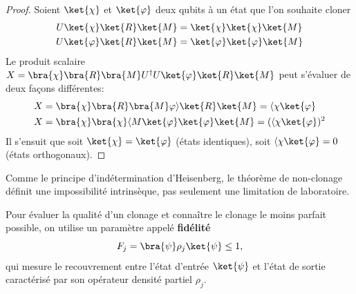 \begin{proof}
Soient $\ket{\chi}$ et $\ket{\varphi}$ deux qubits à un état que l'on souhaite
cloner%
\begin{subequations}%
\begin{align}
U\ket{\chi}\ket{R}\ket{M} & =\ket{\chi}\ket{\chi}\ket{M}\\
U\ket{\varphi}\ket{R}\ket{M} & =\ket{\varphi}\ket{\varphi}\ket{M}
\end{align}%
\end{subequations}%
Le produit scalaire $X=\bra{\chi}\bra{R}\bra{M}U^{\dagger}U\ket{\varphi}
\ket{R}\ket{M}$ peut s'évaluer de deux façons différentes:%
\begin{subequations}%
\begin{align}
X  & =\bra{\chi}\bra{R}\bra{M}\varphi\rangle\ket{R}\ket{M}=\langle
\chi\ket{\varphi}\\
X  & =\bra{\chi}\bra{\chi}\langle M\ket{\varphi}\ket{\varphi}\ket{M}=(\langle
\chi\ket{\varphi})^{2}%
\end{align}%
\end{subequations}%
Il s'ensuit que soit $\ket{\chi}=\ket{\varphi}$ (états identiques), soit
$\langle \chi\ket{\varphi}=0$ (états orthogonaux).
\end{proof}

Comme le principe d'indétermination d'Heisenberg, le théorème de non-clonage
définit une impossibilité intrinsèque, pas seulement une limitation de
laboratoire.

Pour évaluer la qualité d'un clonage et connaître le clonage le moins parfait
possible, on utilise un paramètre appelé \textbf{fidélité}
\begin{equation}
F_{j}=\bra{\psi}\rho_{j}\ket{\psi}\leq 1,
\end{equation}
qui mesure le recouvrement entre l'état d'entrée $\ket{\psi}$ et l'état de
sortie caractérisé par son opérateur densité partiel $\rho_{j}$.

